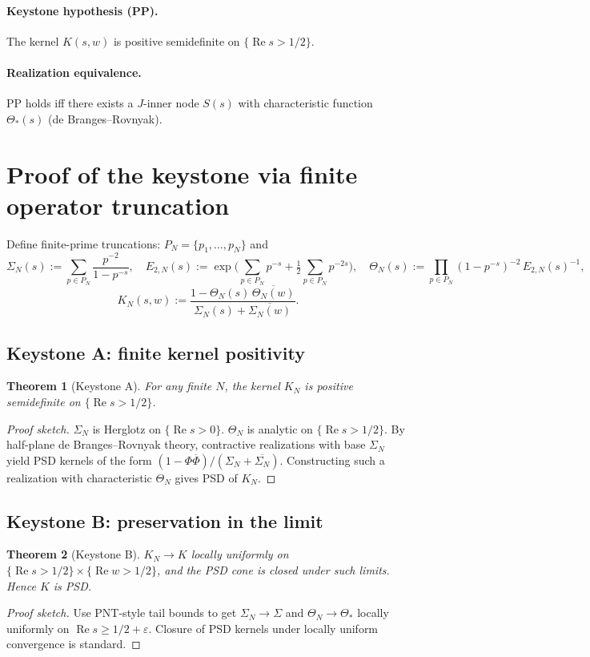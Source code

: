 \documentclass[11pt]{article}
\newcommand{\ReS}{\operatorname{Re}}
\newcommand{\Ths}{\Theta_*}
\newcommand{\Si}{\Sigma}
\newcommand{\SiN}{\Sigma_N}
\newcommand{\ThN}{\Theta_N}
\newcommand{\kN}{K_N}
\theoremstyle{plain}
\newtheorem{theorem}{Theorem}
\theoremstyle{definition}
\theoremstyle{remark}
\begin{document}
\paragraph{Keystone hypothesis (PP).} The kernel $K(s,w)$ is positive semidefinite on $\{ \ReS s>1/2\}$.
\paragraph{Realization equivalence.} PP holds iff there exists a $J$-inner node $S(s)$ with characteristic function $\Ths(s)$ (de Branges--Rovnyak).

\section{Proof of the keystone via finite operator truncation}
Define finite-prime truncations: $P_N=\{p_1,\dots,p_N\}$ and
\[
\SiN(s):=\sum_{p\in P_N}\frac{p^{-2}}{1-p^{-s}},\quad
E_{2,N}(s):=\exp\Big(\sum_{p\in P_N} p^{-s}+\tfrac12\sum_{p\in P_N} p^{-2s}\Big),\quad
\ThN(s):=\prod_{p\in P_N}(1-p^{-s})^{-2}\,E_{2,N}(s)^{-1},
\]
\[
\kN(s,w):=\frac{1 - \ThN(s)\,\overline{\ThN(w)}}{\SiN(s)+\overline{\SiN(w)}}.
\]

\subsection*{Keystone A: finite kernel positivity}
\begin{theorem}[Keystone A]
For any finite $N$, the kernel $\kN$ is positive semidefinite on $\{\ReS s>1/2\}$.
\end{theorem}
\begin{proof}[Proof sketch]
$\SiN$ is Herglotz on $\{\ReS s>0\}$. $\ThN$ is analytic on $\{\ReS s>1/2\}$. By half-plane de Branges--Rovnyak theory, contractive realizations with base $\SiN$ yield PSD kernels of the form $(1-\Phi\overline{\Phi})/(\SiN+\overline{\SiN})$. Constructing such a realization with characteristic $\ThN$ gives PSD of $\kN$.
\end{proof}

\subsection*{Keystone B: preservation in the limit}
\begin{theorem}[Keystone B]
$\kN\to K$ locally uniformly on $\{\ReS s>1/2\}\times\{\ReS w>1/2\}$, and the PSD cone is closed under such limits. Hence $K$ is PSD.
\end{theorem}
\begin{proof}[Proof sketch]
Use PNT-style tail bounds to get $\SiN\to\Si$ and $\ThN\to\Ths$ locally uniformly on $\ReS s\ge 1/2+\varepsilon$. Closure of PSD kernels under locally uniform convergence is standard.
\end{proof}
\end{document}
